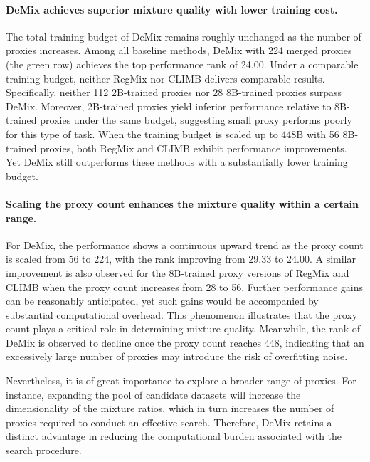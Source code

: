 \documentclass{article}
\theoremstyle{plain}
\theoremstyle{definition}
\theoremstyle{remark}
\begin{document}
\paragraph{DeMix achieves superior mixture quality with lower training cost.}
The total training budget of DeMix remains roughly unchanged as the number of proxies increases. Among all baseline methods, DeMix with 224 merged proxies (the green row) achieves the top performance rank of 24.00. Under a comparable training budget, neither RegMix nor CLIMB delivers comparable results. Specifically, neither 112 2B-trained proxies nor 28 8B-trained proxies surpass DeMix. Moreover, 2B-trained proxies yield inferior performance relative to 8B-trained proxies under the same budget, suggesting small proxy performs poorly for this type of task. When the training budget is scaled up to 448B with 56 8B-trained proxies, both RegMix and CLIMB exhibit performance improvements. Yet DeMix still outperforms these methods with a substantially lower training budget.

\paragraph{Scaling the proxy count enhances the mixture quality within a certain range.}
For DeMix, the performance shows a continuous upward trend as the proxy count is scaled from 56 to 224, with the rank improving from 29.33 to 24.00. A similar improvement is also observed for the 8B-trained proxy versions of RegMix and CLIMB when the proxy count increases from 28 to 56. Further performance gains can be reasonably anticipated, yet such gains would be accompanied by substantial computational overhead. This phenomenon illustrates that the proxy count plays a critical role in determining mixture quality.
Meanwhile, the rank of DeMix is observed to decline once the proxy count reaches 448, indicating that an excessively large number of proxies may introduce the risk of overfitting noise.

Nevertheless, it is of great importance to explore a broader range of proxies. For instance, expanding the pool of candidate datasets will increase the dimensionality of the mixture ratios, which in turn increases the number of proxies required to conduct an effective search. Therefore, DeMix retains a distinct advantage in reducing the computational burden associated with the search procedure.
\end{document}
